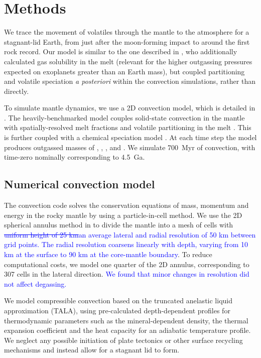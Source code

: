 \documentclass[3p,authoryear]{elsarticle}
\newcommand{\editthree}[2]{\textcolor{blue}{\sout{#1}#2}}
\begin{document}
\section{Methods}

We trace the movement of volatiles through the mantle to the atmosphere for a stagnant-lid Earth, from just after the moon-forming impact to around the first rock record. Our model is similar to the one described in \citet{Ortenzi2020}, who additionally calculated gas solubility in the melt (relevant for the higher outgassing pressures expected on exoplanets greater than an Earth mass), but coupled partitioning and volatile speciation \textit{a posteriori} within the convection simulations, rather than directly.


To simulate mantle dynamics, we use a 2D convection model, which is detailed in \citet{noack2016modeling}. The heavily-benchmarked model couples solid-state convection in the mantle with spatially-resolved melt fractions and volatile partitioning in the melt \citep{Holloway1992, Katz2003, Grott2011}. This is further coupled with a chemical speciation model \citep{French1966, Holloway1981, Fegley2013, gaillard2014theoretical, schaefer2017redox}. At each time step the model produces outgassed masses of , , , and . We simulate 700~Myr of convection, with time-zero nominally corresponding to 4.5~Ga.



\subsection{Numerical convection model}

The convection code solves the conservation equations of mass, momentum and energy in the rocky mantle by using a particle-in-cell method. We use the 2D spherical annulus method in \citet{HERNLUND2008} to divide the mantle into a mesh of cells with \editthree{uniform height of 25 km}{an average lateral and radial resolution of 50 km between grid points. The radial resolution coarsens linearly with depth, varying from 10 km at the surface to 90 km at the core-mantle boundary}. To reduce computational costs, we model one quarter of the 2D annulus, corresponding to 307 cells in the lateral direction. \editthree{}{We found that minor changes in resolution did not affect degassing.}

We model compressible convection based on the truncated anelastic liquid approximation (TALA), using pre-calculated depth-dependent profiles for thermodynamic parameters such as the mineral-dependent density, the thermal expansion coefficient and the heat capacity for an adiabatic temperature profile. We neglect any possible initiation of plate tectonics or other surface recycling mechanisms and instead allow for a stagnant lid to form. 
\end{document}
